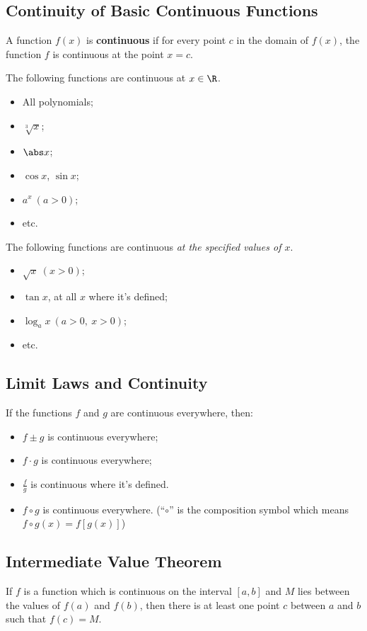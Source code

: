 \subsection{Continuity of Basic Continuous Functions}
\begin{definition}
  A function $f(x)$ is \textbf{continuous} if for every point $c$ in the domain of $f(x)$, the function $f$ is continuous at the point $x=c$.
\end{definition}
The following functions are continuous at $x\in\R$.
\begin{itemize}
  \item All polynomials;
  \item $\sqrt[3]{x}$;
  \item $\abs x$;
  \item $\cos x$, $\sin x$;
  \item $a^x\ (a>0)$;
  \item etc.
\end{itemize}

The following functions are continuous \textit{at the specified values of $x$}.
\begin{itemize}
  \item $\sqrt x\ (x>0)$;
  \item $\tan x$, at all $x$ where it's defined;
  \item $\log_a x\ (a>0,\ x>0)$;
  \item etc.
\end{itemize}

\subsection{Limit Laws and Continuity}
If the functions $f$ and $g$ are continuous everywhere, then:
\begin{itemize}
  \item $f\pm g$ is continuous everywhere;
  \item $f\cdot g$ is continuous everywhere;
  \item $\frac f g$ is continuous where it's defined.
  \item $f\circ g$ is continuous everywhere. (``$\circ$'' is the composition symbol which means $f\circ g(x)=f[g(x)]$)
\end{itemize}

\subsection{Intermediate Value Theorem}
If $f$ is a function which is continuous on the interval $\left[a,b\right]$ and $M$ lies between the values of \(f(a)\) and \(f(b)\), then there is at least one point $c$ between $a$ and $b$ such that $f(c)=M$.

